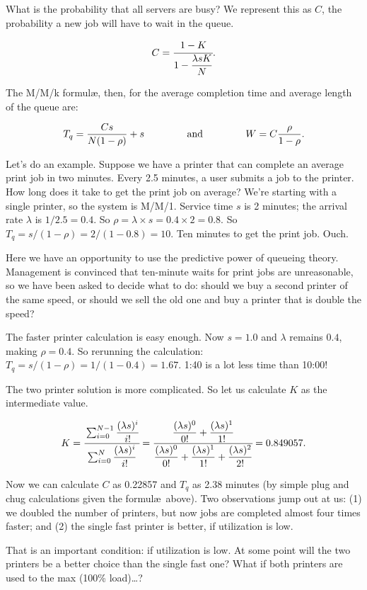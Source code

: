 What is the probability that all servers are busy? We represent this as $C$, the probability a new job will have to wait in the queue.

\[C = \cfrac{1 - K}{1 - \dfrac{\lambda s K}{N}}.\]

The M/M/k formul\ae, then, for the average completion time and average length of the queue are:

\[
  T_{q} = \dfrac{C s}{N(1 - \rho)} + s \mbox{ \qquad\qquad and \qquad\qquad } W = C \dfrac{\rho}{1 - \rho}.
\]

Let's do an example. Suppose we have a printer that can complete an average print job in two minutes. Every 2.5 minutes, a user submits a job to the printer. How long does it take to get the print job on average? We're starting with a single printer, so the system is M/M/1. Service time $s$ is 2 minutes; the arrival rate $\lambda$ is $1/2.5 = 0.4$. So $\rho = \lambda \times s = 0.4 \times 2 = 0.8$. So $T_{q} = s / (1 - \rho ) = 2 / (1 -0.8 ) = 10$. Ten minutes to get the print job. Ouch.

Here we have an opportunity to use the predictive power of queueing theory. Management is convinced that ten-minute waits for print jobs are unreasonable, so we have been asked to decide what to do: should we buy a second printer of the same speed, or should we sell the old one and buy a printer that is double the speed?

The faster printer calculation is easy enough. Now $s = 1.0$ and $\lambda$ remains $0.4$, making $\rho = 0.4$. So rerunning the calculation: $T_{q} = s / (1 - \rho ) = 1 / (1 - 0.4 ) = 1.67$. 1:40 is a lot less time than 10:00! 

The two printer solution is more complicated. So let us calculate $K$ as the intermediate value. 

\[K = \cfrac{\sum_{i=0}^{N-1}\dfrac{(\lambda s)^{i}}{i!}}{{\sum_{i=0}^{N}\dfrac{(\lambda s)^{i}}{i!}}} = \cfrac{\dfrac{(\lambda s)^{0}}{0!} + \dfrac{(\lambda s)^{1}}{1!}}{\dfrac{(\lambda s)^{0}}{0!} + \dfrac{(\lambda s)^{1}}{1!} + \dfrac{(\lambda s)^{2}}{2!}} = 0.849057.\]

Now we can calculate $C$ as 0.22857 and $T_{q}$ as 2.38 minutes (by simple plug and chug calculations given the formul\ae\ above). Two observations jump out at us: (1) we doubled the number of printers, but now jobs are completed almost four times faster; and (2) the single fast printer is better, if utilization is low.

That is an important condition: if utilization is low. At some point will the two printers be a better choice than the single fast one? What if both printers are used to the max (100\% load)\ldots?

